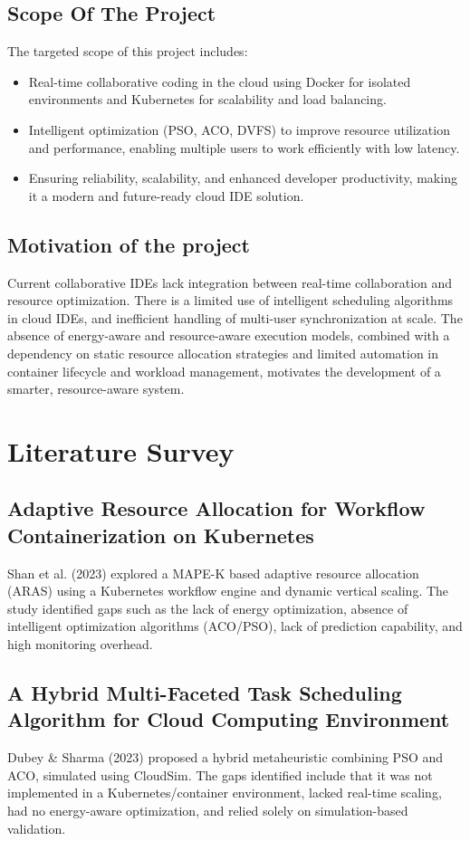 \documentclass[12pt,a4paper]{report}
\begin{document}
\section{Scope Of The Project}
The targeted scope of this project includes:
\begin{itemize}
    \item Real-time collaborative coding in the cloud using Docker for isolated environments and Kubernetes for scalability and load balancing.
    \item Intelligent optimization (PSO, ACO, DVFS) to improve resource utilization and performance, enabling multiple users to work efficiently with low latency.
    \item Ensuring reliability, scalability, and enhanced developer productivity, making it a modern and future-ready cloud IDE solution.
\end{itemize}

\section{Motivation of the project}
Current collaborative IDEs lack integration between real-time collaboration and resource optimization. There is a limited use of intelligent scheduling algorithms in cloud IDEs, and inefficient handling of multi-user synchronization at scale. The absence of energy-aware and resource-aware execution models, combined with a dependency on static resource allocation strategies and limited automation in container lifecycle and workload management, motivates the development of a smarter, resource-aware system.

\chapter{Literature Survey}
\section{Adaptive Resource Allocation for Workflow Containerization on Kubernetes}
Shan et al. (2023) explored a MAPE-K based adaptive resource allocation (ARAS) using a Kubernetes workflow engine and dynamic vertical scaling. The study identified gaps such as the lack of energy optimization, absence of intelligent optimization algorithms (ACO/PSO), lack of prediction capability, and high monitoring overhead.

\section{A Hybrid Multi-Faceted Task Scheduling Algorithm for Cloud Computing Environment}
Dubey \& Sharma (2023) proposed a hybrid metaheuristic combining PSO and ACO, simulated using CloudSim. The gaps identified include that it was not implemented in a Kubernetes/container environment, lacked real-time scaling, had no energy-aware optimization, and relied solely on simulation-based validation.
\end{document}
